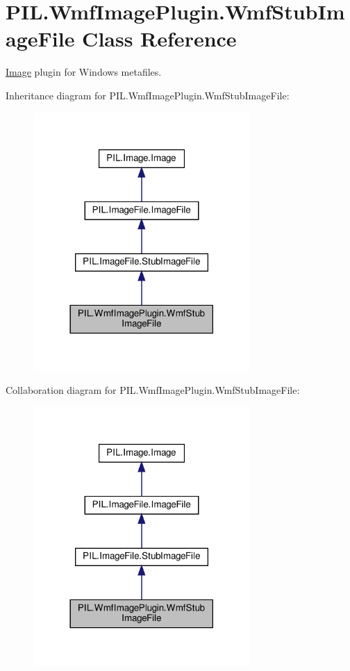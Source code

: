 \hypertarget{classPIL_1_1WmfImagePlugin_1_1WmfStubImageFile}{}\section{P\+I\+L.\+Wmf\+Image\+Plugin.\+Wmf\+Stub\+Image\+File Class Reference}
\label{classPIL_1_1WmfImagePlugin_1_1WmfStubImageFile}


\hyperlink{namespacePIL_1_1Image}{Image} plugin for Windows metafiles.  




Inheritance diagram for P\+I\+L.\+Wmf\+Image\+Plugin.\+Wmf\+Stub\+Image\+File\+:
\nopagebreak
\begin{figure}[H]
\begin{center}
\leavevmode
\includegraphics[width=234pt]{classPIL_1_1WmfImagePlugin_1_1WmfStubImageFile__inherit__graph}
\end{center}
\end{figure}


Collaboration diagram for P\+I\+L.\+Wmf\+Image\+Plugin.\+Wmf\+Stub\+Image\+File\+:
\nopagebreak
\begin{figure}[H]
\begin{center}
\leavevmode
\includegraphics[width=234pt]{classPIL_1_1WmfImagePlugin_1_1WmfStubImageFile__coll__graph}
\end{center}
\end{figure}
